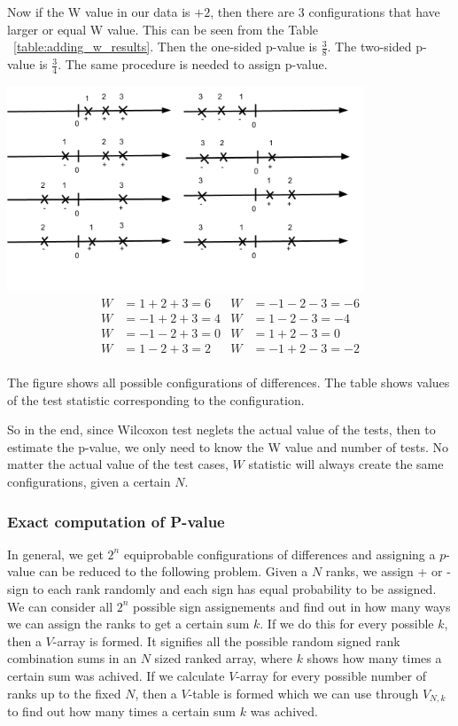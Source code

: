 \documentclass[12pt]{article}
\begin{document}
Now if the W value in our data is $+2$, then there are 3 configurations that have larger or equal W value. This can be seen from the Table ~\ref{table:adding_w_results}. Then the one-sided p-value is $\frac{3}{8}$. The two-sided p-value is $\frac{3}{4}$. The same procedure is needed to assign p-value.

\begin{table}
  \begin{center}
    \includegraphics[width=0.8\textwidth]{rankSignsExample}\\
    \begin{align*}
        W&= 1 + 2 + 3 = 6 & W&=-1 - 2 - 3 = -6\\
        W&= -1 + 2 + 3 = 4 & W&= 1 - 2 - 3 = -4\\
        W&= -1 - 2 + 3 = 0 & W&= 1 + 2 - 3 = 0\\
        W&= 1 - 2 + 3 = 2 & W&= -1 + 2 - 3 = -2\\
    \end{align*}
    \caption{The figure shows all possible configurations of differences. The table shows values of the test statistic corresponding to the configuration.}
    \label{table:adding_w_results}
  \end{center}
\end{table}

So in the end, since Wilcoxon test neglets the actual value of the tests, then to estimate the p-value, we only need to know the W value and number of tests. No matter the actual value of the test cases, $W$ statistic will always create the same configurations, given a certain $N$.

\subsubsection{Exact computation of P-value}
\label{sec:exact_computation_of_p-value}
In general, we get $2^n$ equiprobable configurations of differences and assigning a $p$-value can be reduced to the following problem. Given a $N$ ranks, we assign + or - sign to each rank randomly and each sign has equal probability to be assigned. We can consider all $2^n$ possible sign assignements and find out in how many ways we can assign the ranks to get a certain sum $k$. If we do this for every possible $k$, then a $V$-array is formed. It signifies all the possible random signed rank combination sums in an $N$ sized ranked array, where $k$ shows how many times a certain sum was achived. If we calculate $V$-array for every possible number of ranks up to the fixed $N$, then a $V$-table is formed which we can use through $V_{N, k}$ to find out how many times a certain sum $k$ was achived.
\end{document}
